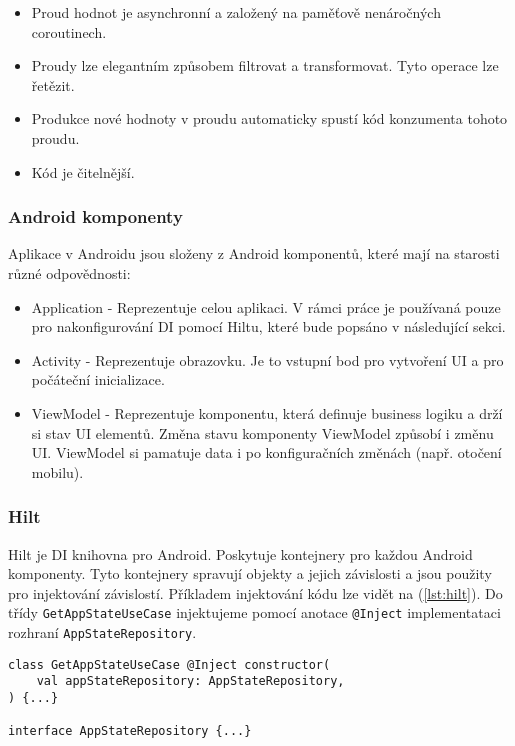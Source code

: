 \begin{itemize}
	\item Proud hodnot je asynchronní a založený na paměťově nenáročných coroutinech.
	
	\item Proudy lze elegantním způsobem filtrovat a transformovat. Tyto operace lze řetězit.
	
	\item Produkce nové hodnoty v proudu automaticky spustí kód konzumenta tohoto proudu.
	
	\item Kód je čitelnější.
\end{itemize}


\subsubsection *{Android komponenty}
Aplikace v Androidu jsou složeny z Android komponentů, které mají na starosti různé odpovědnosti:

\begin{itemize}
	\item Application - Reprezentuje celou aplikaci. V rámci práce je používaná pouze pro nakonfigurování DI pomocí Hiltu, které bude popsáno v následující sekci.
	\item Activity - Reprezentuje obrazovku. Je to vstupní bod pro vytvoření UI a pro počáteční inicializace.
	\item ViewModel - Reprezentuje komponentu, která definuje business logiku a drží si stav UI elementů. Změna stavu komponenty ViewModel způsobí i změnu UI. ViewModel si pamatuje data i po konfiguračních změnách (např. otočení mobilu).
\end{itemize}

\subsubsection *{Hilt}
Hilt je DI knihovna pro Android. Poskytuje kontejnery pro každou Android komponenty. Tyto kontejnery spravují objekty a jejich závislosti a jsou použity pro injektování závislostí. Příkladem injektování kódu lze vidět na (\ref{lst:hilt}). Do třídy \lstinline|GetAppStateUseCase| injektujeme pomocí anotace \lstinline|@Inject| implementataci rozhraní \lstinline|AppStateRepository|.

\begin{lstlisting}[caption={Příklad použití DI pomocí knihovny Hilt}, label={lst:hilt}, tabsize=2]
class GetAppStateUseCase @Inject constructor(
	val appStateRepository: AppStateRepository,
) {...}

interface AppStateRepository {...}
\end{lstlisting}

